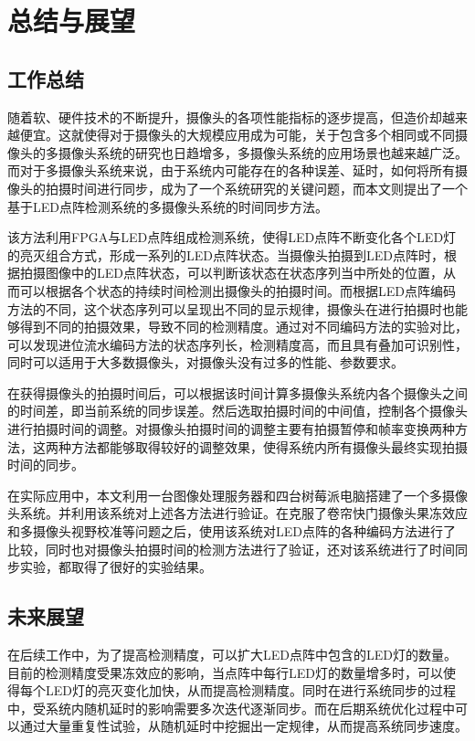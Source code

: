 \chapter{总结与展望}

\section{工作总结}

随着软、硬件技术的不断提升，摄像头的各项性能指标的逐步提高，但造价却越来越便宜。这就使得对于摄像头的大规模应用成为可能，关于包含多个相同或不同摄像头的多摄像头系统的研究也日趋增多，多摄像头系统的应用场景也越来越广泛。而对于多摄像头系统来说，由于系统内可能存在的各种误差、延时，如何将所有摄像头的拍摄时间进行同步，成为了一个系统研究的关键问题，而本文则提出了一个基于LED点阵检测系统的多摄像头系统的时间同步方法。

该方法利用FPGA与LED点阵组成检测系统，使得LED点阵不断变化各个LED灯的亮灭组合方式，形成一系列的LED点阵状态。当摄像头拍摄到LED点阵时，根据拍摄图像中的LED点阵状态，可以判断该状态在状态序列当中所处的位置，从而可以根据各个状态的持续时间检测出摄像头的拍摄时间。而根据LED点阵编码方法的不同，这个状态序列可以呈现出不同的显示规律，摄像头在进行拍摄时也能够得到不同的拍摄效果，导致不同的检测精度。通过对不同编码方法的实验对比，可以发现进位流水编码方法的状态序列长，检测精度高，而且具有叠加可识别性，同时可以适用于大多数摄像头，对摄像头没有过多的性能、参数要求。

在获得摄像头的拍摄时间后，可以根据该时间计算多摄像头系统内各个摄像头之间的时间差，即当前系统的同步误差。然后选取拍摄时间的中间值，控制各个摄像头进行拍摄时间的调整。对摄像头拍摄时间的调整主要有拍摄暂停和帧率变换两种方法，这两种方法都能够取得较好的调整效果，使得系统内所有摄像头最终实现拍摄时间的同步。

在实际应用中，本文利用一台图像处理服务器和四台树莓派电脑搭建了一个多摄像头系统。并利用该系统对上述各方法进行验证。在克服了卷帘快门摄像头果冻效应和多摄像头视野校准等问题之后，使用该系统对LED点阵的各种编码方法进行了比较，同时也对摄像头拍摄时间的检测方法进行了验证，还对该系统进行了时间同步实验，都取得了很好的实验结果。

\section{未来展望}

在后续工作中，为了提高检测精度，可以扩大LED点阵中包含的LED灯的数量。目前的检测精度受果冻效应的影响，当点阵中每行LED灯的数量增多时，可以使得每个LED灯的亮灭变化加快，从而提高检测精度。同时在进行系统同步的过程中，受系统内随机延时的影响需要多次迭代逐渐同步。而在后期系统优化过程中可以通过大量重复性试验，从随机延时中挖掘出一定规律，从而提高系统同步速度。
